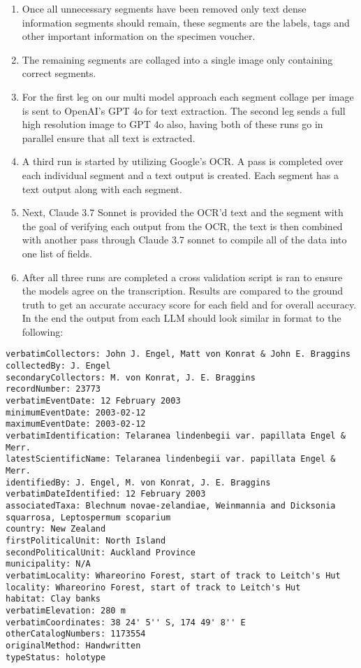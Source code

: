 \documentclass{article}
\begin{document}
\begin{enumerate}
\item Once all unnecessary segments have been removed only text dense information segments should remain, these segments are the labels, tags and other important information on the specimen voucher. 
\item The remaining segments are collaged into a single image only containing correct segments. 
\item For the first leg on our multi model approach each segment collage per image is sent to OpenAI's GPT 4o for text extraction. The second leg sends a full high resolution image to GPT 4o also, having both of these runs go in parallel ensure that all text is extracted.
\item A third run is started by utilizing Google's OCR. A pass is completed over each individual segment and a text output is created. Each segment has a text output along with each segment. 
\item Next, Claude 3.7 Sonnet is provided the OCR'd text and the segment with the goal of verifying each output from the OCR, the text is then combined with another pass through Claude 3.7 sonnet to compile all of the data into one list of fields. 
\item After all three runs are completed a cross validation script is ran to ensure the models agree on the transcription. Results are compared to the ground truth to get an accurate accuracy score for each field and for overall accuracy. In the end the output from each LLM should look similar in format to the following:
\end{enumerate}

\begingroup
\footnotesize          
\begin{verbatim}
verbatimCollectors: John J. Engel, Matt von Konrat & John E. Braggins
collectedBy: J. Engel
secondaryCollectors: M. von Konrat, J. E. Braggins
recordNumber: 23773
verbatimEventDate: 12 February 2003
minimumEventDate: 2003-02-12
maximumEventDate: 2003-02-12
verbatimIdentification: Telaranea lindenbegii var. papillata Engel & Merr.
latestScientificName: Telaranea lindenbegii var. papillata Engel & Merr.
identifiedBy: J. Engel, M. von Konrat, J. E. Braggins
verbatimDateIdentified: 12 February 2003
associatedTaxa: Blechnum novae-zelandiae, Weinmannia and Dicksonia squarrosa, Leptospermum scoparium
country: New Zealand
firstPoliticalUnit: North Island
secondPoliticalUnit: Auckland Province
municipality: N/A
verbatimLocality: Whareorino Forest, start of track to Leitch's Hut
locality: Whareorino Forest, start of track to Leitch's Hut
habitat: Clay banks
verbatimElevation: 280 m
verbatimCoordinates: 38 24' 5'' S, 174 49' 8'' E
otherCatalogNumbers: 1173554
originalMethod: Handwritten
typeStatus: holotype
\end{verbatim}
\endgroup
\end{document}
